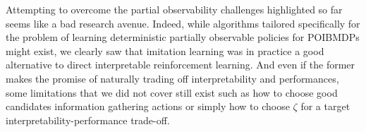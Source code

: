 Attempting to overcome the partial observability challenges highlighted so far seems like a bad research avenue.
Indeed, while algorithms tailored specifically for the problem of learning deterministic partially observable policies for POIBMDPs might exist, we clearly saw that imitation learning was in practice a good alternative to direct interpretable reinforcement learning.
And even if the former makes the promise of naturally trading off interpretability and performances, some limitations that we did not cover still exist such as how to choose good candidates information gathering actions or simply how to choose $\zeta$ for a target interpretability-performance trade-off.
